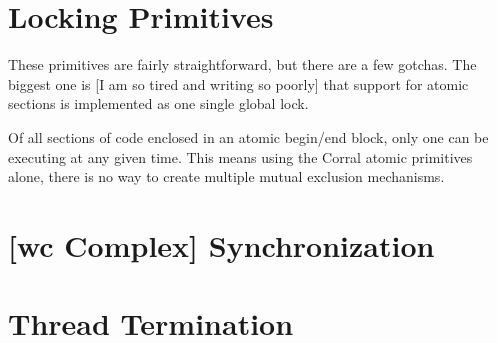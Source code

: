 \section{Locking Primitives}
These primitives are fairly straightforward, but there are a few
gotchas.  The biggest one is [I am so tired and writing so poorly]
that support for atomic sections is implemented as one single global
lock.   

Of all sections of code enclosed in an atomic begin/end block, only
one can be executing at any given time.  This means using the Corral
atomic primitives alone, there is no way to create multiple mutual
exclusion mechanisms. 

\section{[wc Complex] Synchronization}

\section{Thread Termination}

